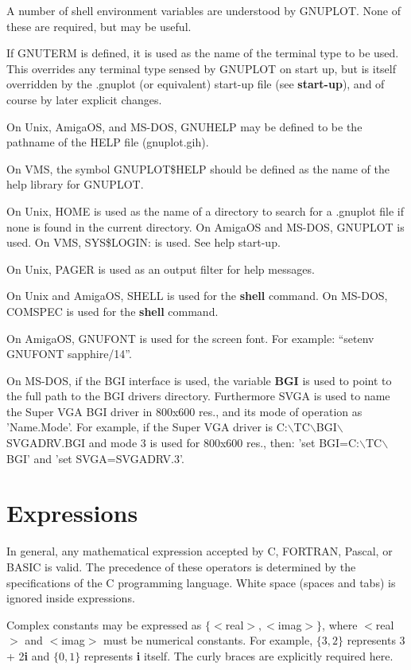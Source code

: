 A number of shell environment variables are understood by GNUPLOT.
None of these are required, but may be useful.

If GNUTERM is defined, it is used as the name of the terminal type to
be used. This overrides any terminal type sensed by GNUPLOT on start
up, but is itself overridden by the .gnuplot (or equivalent) start-up
file (see {\bf start-up}), and of course by later explicit changes.

On Unix, AmigaOS, and MS-DOS, GNUHELP may be defined to be the pathname
of the HELP file (gnuplot.gih).

On VMS, the symbol GNUPLOT\$HELP should be defined as the name of
the help library for GNUPLOT.

On Unix, HOME is used as the name of a directory to search for
a .gnuplot file if none is found in the current directory.
On AmigaOS and MS-DOS, GNUPLOT is used. On VMS, SYS\$LOGIN: is used.
See help start-up.

On Unix, PAGER is used as an output filter for help messages.

On Unix and AmigaOS, SHELL is used for the {\bf shell} command. On MS-DOS,
COMSPEC is used for the {\bf shell} command.

On AmigaOS, GNUFONT is used for the screen font.  For example:
``setenv GNUFONT sapphire/14''.

On MS-DOS, if the BGI interface is used, the variable {\bf BGI} is used to point
to the full path to the BGI drivers directory. Furthermore SVGA is used to
name the Super VGA BGI driver in 800x600 res., and its mode of operation
as 'Name.Mode'.
For example, if the Super VGA driver is C:$\backslash$TC$\backslash$BGI$\backslash$SVGADRV.BGI and mode 3 is
used for 800x600 res., then: 'set BGI=C:$\backslash$TC$\backslash$BGI' and 'set SVGA=SVGADRV.3'.


\section{Expressions}
In general, any mathematical expression accepted by C, FORTRAN,
Pascal, or BASIC is valid. The precedence of these operators is
determined by the specifications of the C programming language.
White space (spaces and tabs) is ignored inside expressions.

Complex constants may be expressed as $\{<$real$>,<$imag$>\}$, where
$<$real$>$ and $<$imag$>$ must be numerical constants.  For example,
$\{3,2\}$ represents 3 + 2{\bf i} and $\{0,1\}$ represents {\bf i}
itself.  The curly braces are explicitly required here.
